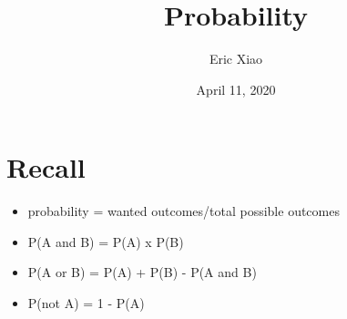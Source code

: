 \documentclass[12pt]{extarticle}
\title{Probability}
\author{Eric Xiao}
\date{April 11, 2020}
\begin{document}
\maketitle

\section{Recall}
\begin{itemize}
    \itemsep 1.0em
    \item {probability = wanted outcomes/total possible outcomes}
    \item {P(A and B) = P(A) x P(B)}
    \item {P(A or B) = P(A) + P(B) - P(A and B)}
    \item {P(not A) = 1 - P(A)}
\end{itemize}
\end{document}
